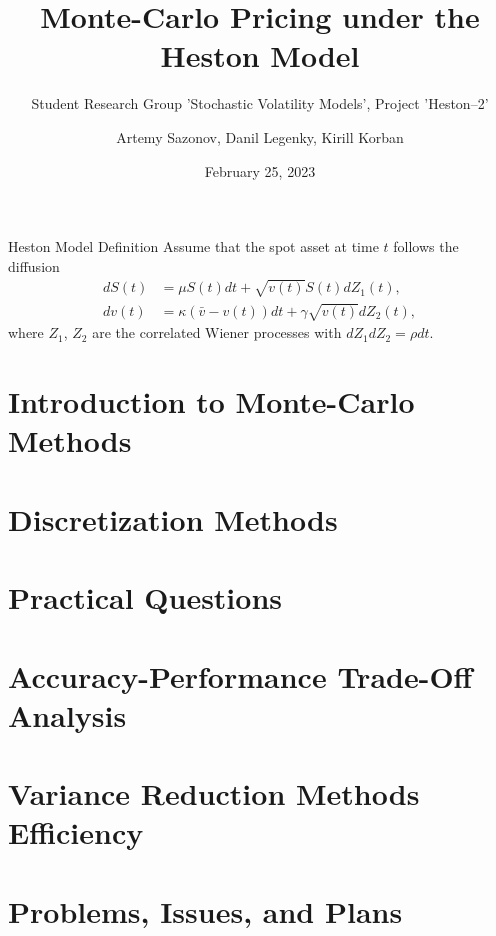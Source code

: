 \documentclass[aspectratio=169]{beamer}
\subtitle{Student Research Group 'Stochastic Volatility Models', Project 'Heston--2'}
\title{Monte-Carlo Pricing under the Heston Model}
\author{Artemy Sazonov, Danil Legenky, Kirill Korban}
\institute{Lomonosov Moscow State Univesity, Faculty of Mechanics and Mathematics}
\date{February 25, 2023}
\begin{document}
    \maketitle

    \begin{frame}{Heston Model Definition}
        Assume that the spot asset at time $t$ follows the diffusion
        \begin{align}
            dS(t) & = \mu S(t)dt + \sqrt{v(t)} S(t) dZ_1(t), \label{Heston:price}\\
            dv(t) & = \kappa\left(\bar v -  v(t)\right) dt + \gamma\sqrt{v(t)} dZ_2(t), \label{Heston:variance}
        \end{align}
        where $Z_1$, $Z_2$ are the correlated Wiener processes with $dZ_1dZ_2 = \rho dt$.
    \end{frame}

    \section{Introduction to Monte-Carlo Methods}
        

    \section{Discretization Methods}
        

    \section{Practical Questions}
        

    \section{Accuracy-Performance Trade-Off Analysis}
        

    \section{Variance Reduction Methods Efficiency}
        

    \section{Problems, Issues, and Plans}
        
\end{document}
